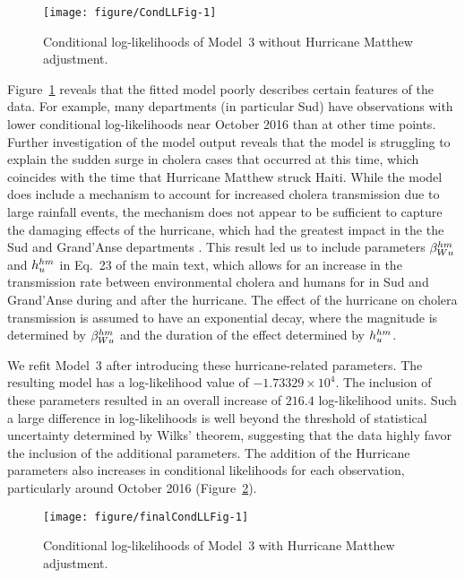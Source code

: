 \begin{figure}[!ht]
\begin{knitrout}
\color{fgcolor}
\texttt{[image: figure/CondLLFig-1]} 
\end{knitrout}
\caption[Conditional log-likelihoods of Model~3 without Hurricane Matthew adjustment.]{\label{fig:condLL}Conditional log-likelihoods of Model~3 without Hurricane Matthew adjustment.}
\end{figure}

Figure~\ref{fig:condLL} reveals that the fitted model poorly describes certain features of the data.
For example, many departments (in particular Sud) have observations with lower conditional log-likelihoods near October 2016 than at other time points.
Further investigation of the model output reveals that the model is struggling to explain the sudden surge in cholera cases that occurred at this time, which coincides with the time that Hurricane Matthew struck Haiti.
While the model does include a mechanism to account for increased cholera transmission due to large rainfall events, the mechanism does not appear to be sufficient to capture the damaging effects of the hurricane, which had the greatest impact in the the Sud and Grand'Anse departments \cite{ferreirai16}.
This result led us to include parameters $\beta_{Wu}^{hm}$ and $h_{u}^{hm}$ in Eq.~23 of the main text, which allows for an increase in the transmission rate between environmental cholera and humans for in Sud and Grand'Anse during and after the hurricane.
The effect of the hurricane on cholera transmission is assumed to have an exponential decay, where the magnitude is determined by $\beta_{Wu}^{hm}$ and the duration of the effect determined by $h_{u}^{hm}$.



We refit Model~3 after introducing these hurricane-related parameters.
The resulting model has a log-likelihood value of $\ensuremath{-1.73329\times 10^{4}}$.
The inclusion of these parameters resulted in an overall increase of $216.4$ log-likelihood units.
Such a large difference in log-likelihoods is well beyond the threshold of statistical uncertainty determined by Wilks' theorem, suggesting that the data highly favor the inclusion of the additional parameters.
The addition of the Hurricane parameters also increases in conditional likelihoods for each observation, particularly around October 2016 (Figure~\ref{fig:finalCondLL}).



\begin{figure}[!ht]
\begin{knitrout}
\color{fgcolor}
\texttt{[image: figure/finalCondLLFig-1]} 
\end{knitrout}
\caption[Conditional log-likelihoods of Model~3 with Hurricane Matthew adjustment.]{\label{fig:finalCondLL}Conditional log-likelihoods of Model~3 with Hurricane Matthew adjustment.}
\end{figure}

